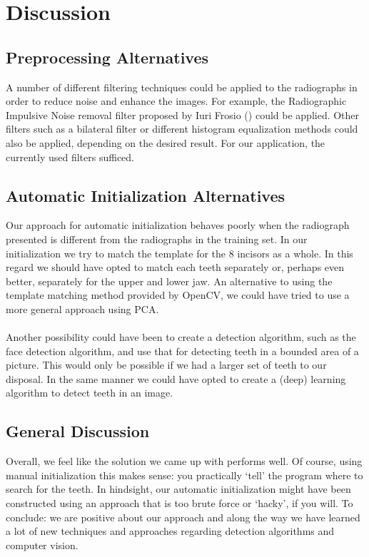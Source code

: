 \documentclass[11pt]{article}
\begin{document}
\section{Discussion}

\subsection{Preprocessing Alternatives}

A number of different filtering techniques could be applied to the radiographs in order to reduce noise and enhance the images. For example, the Radiographic Impulsive Noise removal filter proposed by Iuri Frosio (\cite{rainfilter}) could be applied. Other filters such as a bilateral filter or different histogram equalization methods could also be applied, depending on the desired result. For our application, the currently used filters sufficed.

\subsection{Automatic Initialization Alternatives}

Our approach for automatic initialization behaves poorly when the radiograph presented is different from the radiographs in the training set. In our initialization we try to match the template for the 8 incisors as a whole. In this regard we should have opted to match each teeth separately or, perhaps even better, separately for the upper and lower jaw. An alternative to using the template matching method provided by OpenCV, we could have tried to use a more general approach using PCA. \\~\\
Another possibility could have been to create a detection algorithm, such as the face detection algorithm, and use that for detecting teeth in a bounded area of a picture. This would only be possible if we had a larger set of teeth to our disposal. In the same manner we could have opted to create a (deep) learning algorithm to detect teeth in an image.

\subsection{General Discussion}
Overall, we feel like the solution we came up with performs well. Of course, using manual initialization this makes sense: you practically `tell' the program where to search for the teeth. In hindsight, our automatic initialization might have been constructed using an approach that is too brute force or `hacky', if you will. To conclude: we are positive about our approach and along the way we have learned a lot of new techniques and approaches regarding detection algorithms and computer vision.

\newpage
{}



\end{document}
